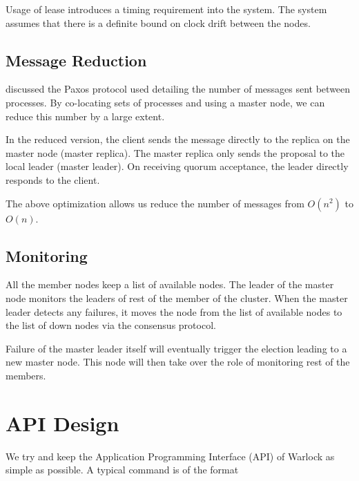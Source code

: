 Usage of lease introduces a timing requirement into the system. The system
assumes that there is a definite bound on clock drift%
between the nodes.

\subsection{Message Reduction}

 discussed the Paxos protocol used detailing the number
of messages sent between processes. By co-locating sets of processes and
using a master node, we can reduce this number by a large extent.

In the reduced version, the client sends the message directly to the
replica on the master node (master replica). The master replica only
sends the proposal to the local leader (master leader). On receiving quorum
acceptance, the leader directly responds to the client.

The above optimization allows us reduce the number of messages from
$O(n^2)$ to $O(n)$.

\subsection{Monitoring}

All the member nodes%
keep a list of available nodes.
The leader of the master node monitors the leaders of rest of the member
of the cluster. When the master leader detects any failures, it moves the
node from the list of available nodes to the list of down nodes via the
consensus protocol.

Failure of the master leader itself will eventually trigger the election
leading to a new master node. This node will then take over the role of
monitoring rest of the members.

\section{API Design}

We try and keep the Application Programming Interface (API) of Warlock as
simple as possible. A typical command is of the format

